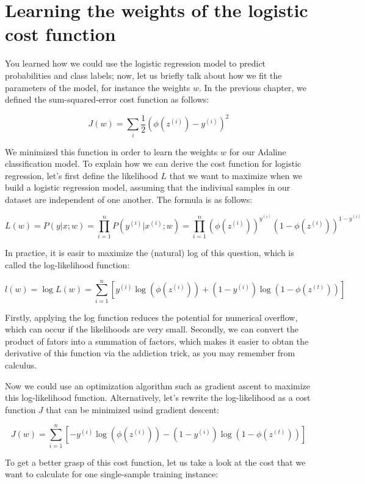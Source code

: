 \documentclass[11pt]{article}
\begin{document}
    \section{Learning the weights of the logistic cost
function}\label{learning-the-weights-of-the-logistic-cost-function}

    You learned how we could use the logistic regression model to predict
probabilities and class labels; now, let us briefly talk about how we
fit the parameters of the model, for instance the weights \(w\). In the
previous chapter, we defined the sum-squared-error cost function as
follows:

\[J(w) = \sum_i \frac{1}{2}(\phi(z^{(i)}) - y^{(i)})^2\]

We minimized this function in order to learn the weights \(w\) for our
Adaline classification model. To explain how we can derive the cost
function for logistic regression, let's first define the likelihood
\(L\) that we want to maximize when we build a logistic regression
model, assuming that the indiviual samples in our dataset are
independent of one another. The formula is as follows:

\[L(w) = P(y|x;w) = \prod_{i = 1}^n P(y^{(i)}|x^{(i)};w) = \prod_{i = 1}^n (\phi(z^{(i)}))^{y^{(i)}} (1 - \phi(z^{(i)}))^{1-y^{(i)}}\]

In practice, it is easir to maximize the (natural) log of this question,
which is called the log-likelihood function:

\[l(w) = \log L(w) = \sum_{i = 1}^n [y^{(i)} \log(\phi(z^{(i)})) + (1 - y^{(i)}) \log(1 - \phi(z^{(t)}))]\]

Firstly, applying the log function reduces the potential for numerical
overflow, which can occur if the likelihoods are very small. Secondly,
we can convert the product of fators into a summation of factors, which
makes it easier to obtan the derivative of this function via the
addiction trick, as you may remember from calculus.

Now we could use an optimization algorithm such as gradient ascent to
maximize this log-likelihood function. Alternatively, let's rewrite the
log-likelihood as a cost function \(J\) that can be minimized usind
gradient descent:

\[J(w) = \sum_{i = 1}^n [-y^{(i)} \log(\phi(z^{(i)})) - (1 - y^{(i)}) \log(1 - \phi(z^{(t)}))]\]

To get a better grasp of this cost function, let us take a look at the
cost that we want to calculate for one single-sample training instance:
\end{document}
